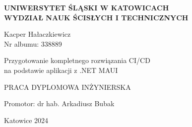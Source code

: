 \renewcommand{\maketitle}{
    \begin{titlepage}
    \begin{center}
        \textbf{UNIWERSYTET ŚLĄSKI W KATOWICACH\\
        WYDZIAŁ NAUK ŚCISŁYCH I TECHNICZNYCH\\
        }

        \vspace{1.5 cm}
        
        \Large 
        Kacper Hałaczkiewicz\\
        Nr albumu: 338889\\
        
        \vspace{0.5 cm}
        
        Przygotowanie kompletnego rozwiązania CI/CD \\
        na podstawie aplikacji z .NET MAUI
        
        \vspace*{2.0 cm}
    
        \small
        PRACA DYPLOMOWA INŻYNIERSKA\\
        
        \vspace{8.0 cm}
    
        \large
        Promotor: dr hab. Arkadiusz Bubak\\
        
        \vspace{1 cm}
        
        \small 
        Katowice 2024\\
    \end{center}
    \clearpage
    \end{titlepage}
}

\maketitle

